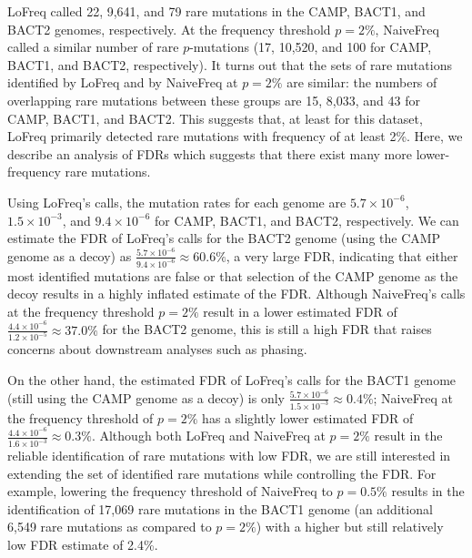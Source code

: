 LoFreq called 22, 9,641, and 79 rare mutations in the CAMP, BACT1, and BACT2 genomes, respectively. At the frequency threshold $p = 2\%$, NaiveFreq called a similar number of rare $p$-mutations (17, 10,520, and 100 for CAMP, BACT1, and BACT2, respectively). It turns out that the sets of rare mutations identified by LoFreq and by NaiveFreq at $p = 2\%$ are similar: the numbers of overlapping rare mutations between these groups are 15, 8,033, and 43 for CAMP, BACT1, and BACT2. This suggests that, at least for this dataset, LoFreq primarily detected rare mutations with frequency of at least 2\%. Here, we describe an analysis of FDRs which suggests that there exist many more lower-frequency rare mutations.

Using LoFreq's calls, the mutation rates for each genome are $5.7 \times 10^{-6}$, $1.5 \times 10^{-3}$, and $9.4 \times 10^{-6}$ for CAMP, BACT1, and BACT2, respectively. We can estimate the FDR of LoFreq's calls for the BACT2 genome (using the CAMP genome as a decoy) as $\frac{5.7 \times 10^{-6}}{9.4 \times 10^{-6}} \approx 60.6\%$, a very large FDR, indicating that either most identified mutations are false or that selection of the CAMP genome as the decoy results in a highly inflated estimate of the FDR. Although NaiveFreq's calls at the frequency threshold $p = 2\%$ result in a lower estimated FDR of $\frac{4.4 \times 10^{-6}}{1.2 \times 10^{-5}} \approx 37.0\%$ for the BACT2 genome, this is still a high FDR that raises concerns about downstream analyses such as phasing.

On the other hand, the estimated FDR of LoFreq's calls for the BACT1 genome (still using the CAMP genome as a decoy) is only $\frac{5.7 \times 10^{-6}}{1.5 \times 10^{-3}} \approx 0.4\%$; NaiveFreq at the frequency threshold of $p = 2\%$ has a slightly lower estimated FDR of $\frac{4.4 \times 10^{-6}}{1.6 \times 10^{-3}} \approx 0.3\%$. Although both LoFreq and NaiveFreq at $p = 2\%$ result in the reliable identification of rare mutations with low FDR, we are still interested in extending the set of identified rare mutations while controlling the FDR. For example, lowering the frequency threshold of NaiveFreq to $p = 0.5\%$ results in the identification of 17,069 rare mutations in the BACT1 genome (an additional 6,549 rare mutations as compared to $p = 2\%$) with a higher but still relatively low FDR estimate of 2.4\%.\endinput